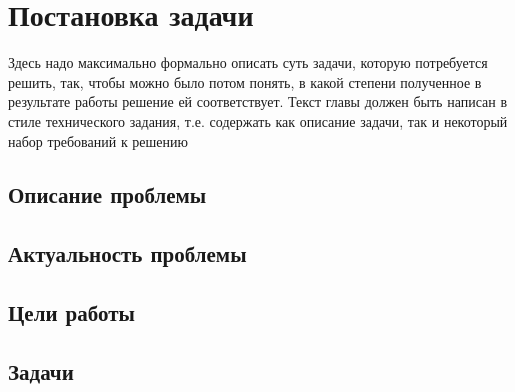 
\chapter{Постановка задачи}
\label{sec:Chapter1}
Здесь надо максимально формально описать суть задачи, которую потребуется решить, так, чтобы можно было потом понять, в какой степени полученное в результате работы решение ей соответствует. Текст главы должен быть написан в стиле технического задания, т.е. содержать как описание задачи, так и некоторый набор требований к решению

\section{Описание проблемы}

\section{Актуальность проблемы}

\section{Цели работы}

\section{Задачи}

\newpage